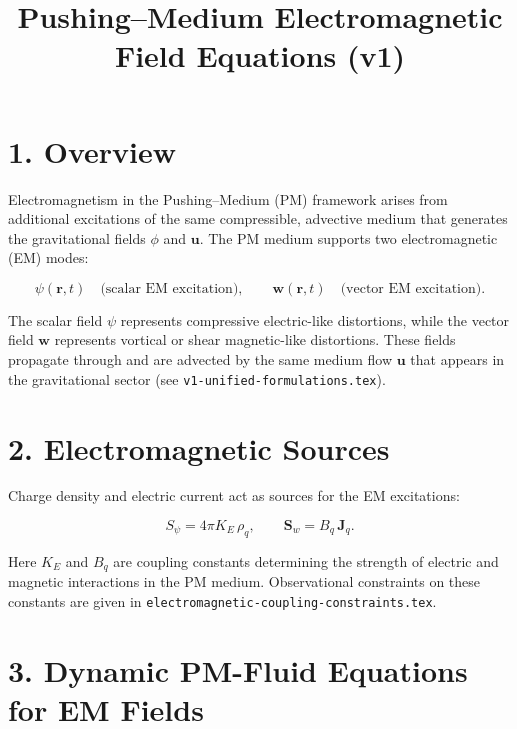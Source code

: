 \documentclass{article}
\begin{document}
\title{Pushing--Medium Electromagnetic Field Equations (v1)}
\author{}
\date{}
\maketitle

\section*{1. Overview}

Electromagnetism in the Pushing--Medium (PM) framework arises from additional
excitations of the same compressible, advective medium that generates the
gravitational fields $\phi$ and $\mathbf u$.  The PM medium supports two
electromagnetic (EM) modes:


\[
\psi(\mathbf r,t) \quad \text{(scalar EM excitation)},
\qquad
\mathbf w(\mathbf r,t) \quad \text{(vector EM excitation)}.
\]


The scalar field $\psi$ represents compressive electric-like distortions, while
the vector field $\mathbf w$ represents vortical or shear magnetic-like
distortions.  These fields propagate through and are advected by the same medium
flow $\mathbf u$ that appears in the gravitational sector
(see \texttt{v1-unified-formulations.tex}).

\section*{2. Electromagnetic Sources}

Charge density and electric current act as sources for the EM excitations:


\[
S_\psi = 4\pi K_E\,\rho_q,
\qquad
\mathbf S_w = B_q\,\mathbf J_q.
\]


Here $K_E$ and $B_q$ are coupling constants determining the strength of electric
and magnetic interactions in the PM medium.  Observational constraints on these
constants are given in \texttt{electromagnetic-coupling-constraints.tex}.

\section*{3. Dynamic PM-Fluid Equations for EM Fields}
\end{document}
